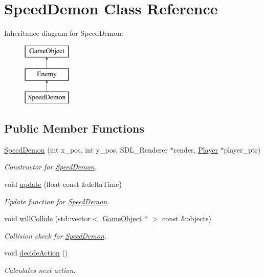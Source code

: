 \hypertarget{class_speed_demon}{}\section{Speed\+Demon Class Reference}
\label{class_speed_demon}
Inheritance diagram for Speed\+Demon\+:\begin{figure}[H]
\begin{center}
\leavevmode
\includegraphics[height=3.000000cm]{class_speed_demon}
\end{center}
\end{figure}
\subsection*{Public Member Functions}
\begin{DoxyCompactItemize}
\item 
\hyperlink{class_speed_demon_a224e6ae33da2dd3471c0a83d26a3b23f}{Speed\+Demon} (int x\+\_\+pos, int y\+\_\+pos, S\+D\+L\+\_\+\+Renderer $\ast$render, \hyperlink{class_player}{Player} $\ast$player\+\_\+ptr)
\begin{DoxyCompactList}\small\item\em Constructor for \hyperlink{class_speed_demon}{Speed\+Demon}. \end{DoxyCompactList}\item 
\hypertarget{class_speed_demon_ac84b479a3261e6814aa551b403a78da4}{}void \hyperlink{class_speed_demon_ac84b479a3261e6814aa551b403a78da4}{update} (float const \&delta\+Time)\label{class_speed_demon_ac84b479a3261e6814aa551b403a78da4}

\begin{DoxyCompactList}\small\item\em Update function for \hyperlink{class_speed_demon}{Speed\+Demon}. \end{DoxyCompactList}\item 
void \hyperlink{class_speed_demon_aeae7a4127babf8a8bcc6e2c56512652a}{will\+Collide} (std\+::vector$<$ \hyperlink{class_game_object}{Game\+Object} $\ast$ $>$ const \&objects)
\begin{DoxyCompactList}\small\item\em Collision check for \hyperlink{class_speed_demon}{Speed\+Demon}. \end{DoxyCompactList}\item 
void \hyperlink{class_speed_demon_a36b21b02c91a92bd471b9de5975f7162}{decide\+Action} ()
\begin{DoxyCompactList}\small\item\em Calculates next action. \end{DoxyCompactList}\end{DoxyCompactItemize}
